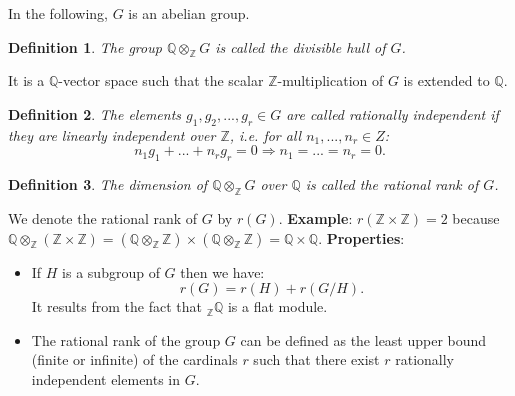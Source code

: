 \documentclass[12pt]{article}
\newtheorem{defn}{Definition}
\begin{document}
 In the following, $G$ is an abelian group.
\begin{defn} The group $\mathbb{Q} \otimes_{\mathbb{Z}} G$ is called the divisible hull of $G$. \end{defn} It is a $\mathbb{Q}$-vector space such that the scalar $\mathbb{Z}$-multiplication of $G$ is extended to $\mathbb{Q}$.
\begin{defn} The elements $g_1, g_2, ... , g_r \in G$ are called rationally independent if they are linearly independent over $\mathbb{Z}$, i.e. for all $n_1, ... , n_r \in Z$:\begin{equation*}
n_1 g_1 + ... + n_r g_r = 0 \Rightarrow n_1 = ... = n_r = 0. \end{equation*}\end{defn} 
\begin{defn} The dimension of  $\mathbb{Q} \otimes_{\mathbb{Z}} G$ over $\mathbb{Q}$ is called the rational rank of $G$.\end{defn} We denote the rational rank of $G$ by $r(G)$.\newline
\textbf{Example}:\newline
$r(\mathbb{Z} \times \mathbb{Z}) = 2$ because $\mathbb{Q} \otimes_\mathbb{Z} (\mathbb{Z} \times \mathbb{Z}) = (\mathbb{Q} \otimes_{\mathbb{Z}} \mathbb{Z}) \times (\mathbb{Q} \otimes_{\mathbb{Z}} \mathbb{Z}) = \mathbb{Q} \times \mathbb{Q}$.\newline
\textbf{Properties}:
\begin{itemize}
\item If $H$ is a subgroup of $G$ then we have:\begin{equation*}
r(G) = r(H) + r(G/H). \end{equation*} It results from the fact that $_\mathbb{Z}\mathbb{Q}$ is a flat module.
\item The rational rank of the group $G$ can be defined as the least upper bound (finite or infinite) of the cardinals $r$ such that there exist $r$ rationally independent elements in $G$.
\end{itemize}
  

\end{document}
